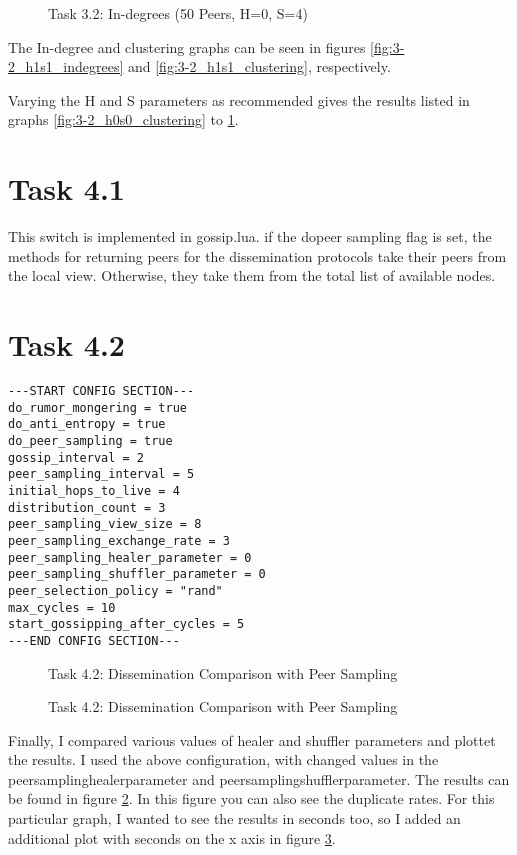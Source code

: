 \documentclass[a4paper]{article}
\begin{document}
\begin{figure}
    
    \caption{Task 3.2: In-degrees (50 Peers, H=0, S=4)}
    \label{fig:3-2_h0s4_indegrees}
\end{figure}

The In-degree and clustering graphs can be seen in figures \ref{fig:3-2_h1s1_indegrees} and \ref{fig:3-2_h1s1_clustering}, respectively.

Varying the H and S parameters as recommended gives the results listed in graphs \ref{fig:3-2_h0s0_clustering} to \ref{fig:3-2_h0s4_indegrees}.

\section{Task 4.1}

This switch is implemented in gossip.lua. if the do\textunderscore peer \textunderscore sampling flag is set, the methods for returning peers for the dissemination protocols take their peers from the local view. Otherwise, they take them from the total list of available nodes.

\section{Task 4.2}

\begin{lstlisting}
---START CONFIG SECTION---
do_rumor_mongering = true
do_anti_entropy = true
do_peer_sampling = true
gossip_interval = 2
peer_sampling_interval = 5
initial_hops_to_live = 4
distribution_count = 3
peer_sampling_view_size = 8
peer_sampling_exchange_rate = 3
peer_sampling_healer_parameter = 0
peer_sampling_shuffler_parameter = 0
peer_selection_policy = "rand"
max_cycles = 10
start_gossipping_after_cycles = 5
---END CONFIG SECTION---

\end{lstlisting}

\begin{figure}
    
    \caption{Task 4.2: Dissemination Comparison with Peer Sampling}
    \label{fig:4-2}
\end{figure}

\begin{figure}
    
    \caption{Task 4.2: Dissemination Comparison with Peer Sampling}
    \label{fig:4-2_seconds}
\end{figure}

Finally, I compared various values of healer and shuffler parameters and plottet the results. I used the above configuration, with changed values in the peer\textunderscore sampling\textunderscore healer\textunderscore parameter and peer\textunderscore sampling\textunderscore shuffler\textunderscore parameter. The results can be found in figure \ref{fig:4-2}. In this figure you can also see the duplicate rates.
For this particular graph, I wanted to see the results in seconds too, so I added an additional plot with seconds on the x axis in figure \ref{fig:4-2_seconds}.
\end{document}
